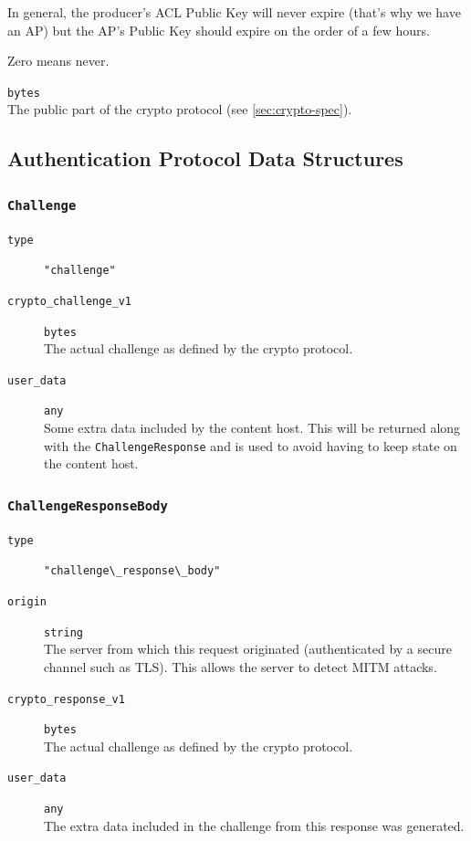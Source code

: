 \documentclass[pdftex,12pt,a4papaer,twoside,notitlepage]{report}
\begin{document}
\begin{appendices}
\begin{leftbar}
\begin{description}[labelindent=2em,leftmargin=3em]
  In general, the producer's ACL Public Key will never expire (that's why we
  have an AP) but the AP's Public Key should expire on the order of a few
  hours.
  
  Zero means never.

\item[\texttt{public\_v1}] \texttt{bytes} \\
  The public part of the crypto protocol (see \cref{sec:crypto-spec}).
\end{description}
\end{leftbar}

\subsection{Authentication Protocol Data Structures}

\subsubsection{\texttt{Challenge}}

\begin{leftbar}
\begin{description}
\item[\texttt{type}] \verb="challenge"=
\item[\texttt{crypto\_challenge\_v1}] \texttt{bytes} \\
  The actual challenge as defined by the crypto protocol.
\item[\texttt{user\_data}] \texttt{any} \\
  Some extra data included by the content host. This will be returned along with
  the \texttt{ChallengeResponse} and is used to avoid having to keep state on
  the content host.
\end{description}
\end{leftbar}

\subsubsection{\texttt{ChallengeResponseBody}}
\label{struct:challenge_response_body}

\begin{leftbar}
\begin{description}
\item[\texttt{type}] \verb="challenge\_response\_body"=
\item[\texttt{origin}] \texttt{string} \\
  The server from which this request originated (authenticated by a secure
  channel such as TLS). This allows the server to detect MITM attacks.
\item[\texttt{crypto\_response\_v1}] \texttt{bytes} \\ 
  The actual challenge as defined by the crypto protocol.
\item[\texttt{user\_data}] \texttt{any} \\
  The extra data included in the challenge from this response was generated.
\end{description}
\end{leftbar}


\end{appendices}
\end{document}
